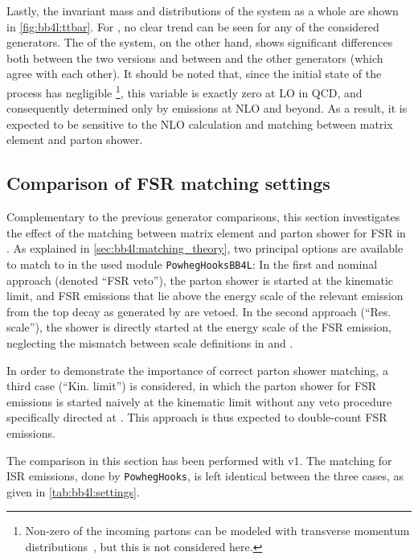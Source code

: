 Lastly, the invariant mass and \pt distributions of the \ttbar system as a whole are shown in \cref{fig:bb4l:ttbar}. For \mtt, no clear trend can be seen for any of the considered generators. The \pt of the \ttbar system, on the other hand, shows significant differences both between the two \bbfourl versions and between \bbfourl and the other generators (which agree with each other). It should be noted that, since the initial state of the \pptt process has negligible \pt\footnote{Non-zero \pt of the incoming partons can be modeled with transverse momentum distributions~\cite{Boer:2011fh}, but this is not considered here.}, this variable is exactly zero at LO in QCD, and consequently determined only by emissions at NLO and beyond. As a result, it is expected to be sensitive to the NLO calculation and matching between matrix element and parton shower.

\subsection{Comparison of FSR matching settings}
\label{sec:bb4l:matching}

Complementary to the previous generator comparisons, this section investigates the effect of the matching between matrix element and parton shower for FSR in \bbfourl. As explained in \cref{sec:bb4l:matching_theory}, two principal options are available to match \bbfourl to \pythia in the used module \texttt{PowhegHooksBB4L}: In the first and nominal approach (denoted ``FSR veto''), the parton shower is started at the kinematic limit, and FSR emissions that lie above the \powheg energy scale of the relevant emission from the top decay as generated by \powheg are vetoed. In the second approach (``Res. scale''), the shower is directly started at the energy scale of the \powheg FSR emission, neglecting the mismatch between scale definitions in \powheg and \pythia. 

In order to demonstrate the importance of correct parton shower matching, a third case (``Kin. limit'') is considered, in which the parton shower for FSR emissions is started naively at the kinematic limit without any veto procedure specifically directed at \bbfourl. This approach is thus expected to double-count FSR emissions.

The comparison in this section has been performed with \bbfourl v1. The matching for ISR emissions, done by \texttt{PowhegHooks}, is left identical between the three cases, as given in \cref{tab:bb4l:settings}.

